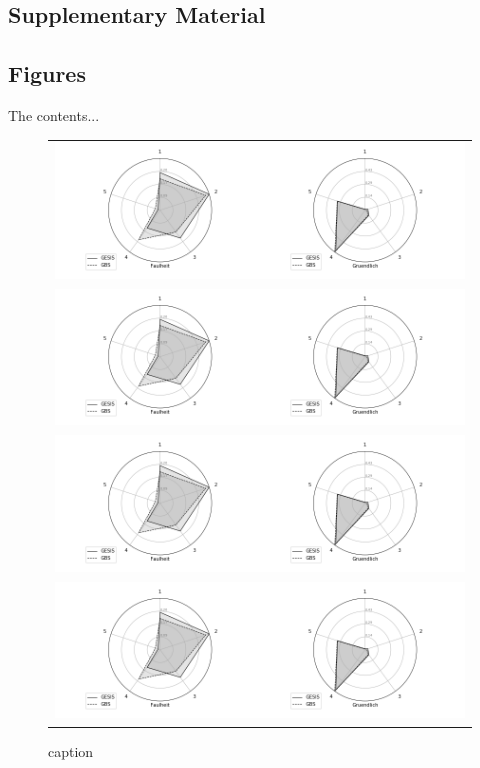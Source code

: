 
\begin{appendices}


\chapter{Supplementary Material}

\section{Figures}

The contents...

\begin{figure}[ht]
	\begin{center}
\begin{tabular}{c}
\includegraphics[scale=0.40,angle=0]{fig/Conscientiousness_figure} \\
\includegraphics[scale=0.40,angle=0]{fig/Conscientiousness_figure} \\
\includegraphics[scale=0.40,angle=0]{fig/Conscientiousness_figure} \\
\includegraphics[scale=0.40,angle=0]{fig/Conscientiousness_figure} \\
\end{tabular}
\caption{caption}
\end{center}
\end{figure}


\end{appendices}
